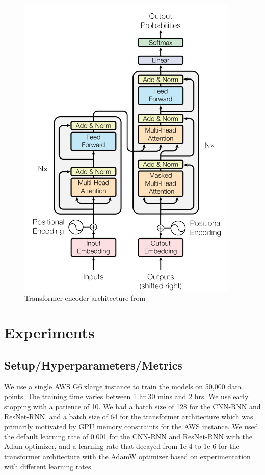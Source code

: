 \documentclass{article}
\begin{document}
\begin{figure}[H]
	\centering \includegraphics[scale=0.5]{transformer_decoder.png}
	\caption{Transformer encoder architecture from \cite{transformer}}
\end{figure}


\section{Experiments}

\subsection{Setup/Hyperparameters/Metrics}

We use a single AWS G6.xlarge instance to train the models on 50,000 data points. The training time varies between  1 hr 30 mins and 2 hrs. We use early stopping with a patience of 10. We had a batch size of 128 for the CNN-RNN and ResNet-RNN, and a batch size of 64 for the transformer architecture which was primarily motivated by GPU memory constraints for the AWS instance. We used the default learning rate of 0.001 for the CNN-RNN and ResNet-RNN with the Adam optimizer, and a learning rate that decayed from 1e-4 to 1e-6 for the transformer architecture with the AdamW optimizer based on experimentation with different learning rates.
\end{document}
